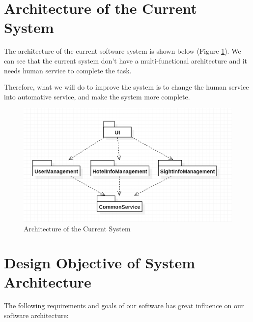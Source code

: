\documentclass[10pt]{article}
\begin{document}
\section{Architecture of the Current System}
The architecture of the current software system is shown below (Figure \ref{Architecture of Current System}). We can see that the current system don’t have a multi-functional architecture and it needs human service to complete the task.

Therefore, what we will do to improve the system is to change the human service into automative service, and make the system more complete.

\begin{figure}[H]
	\centering
	\includegraphics[width=14cm]{current.png}
	\caption{Architecture of the Current System}
	\label{Architecture of Current System}
\end{figure}

\section{Design Objective of System Architecture}
The following requirements and goals of our software has great influence on our software architecture:
\end{document}

